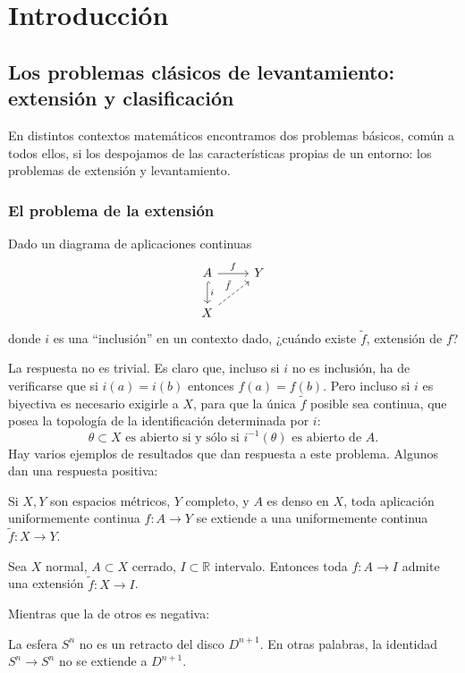 \chapter{Introducción}\label{cap1}
\section{Los problemas clásicos de levantamiento: extensión y clasificación}\label{sec:levext}
En distintos contextos matemáticos encontramos dos problemas básicos, común a todos ellos, si los despojamos de las características propias de un entorno: los problemas de extensión y levantamiento. \par

\subsection*{El problema de la extensión}\label{c1:ext}
Dado un diagrama de aplicaciones continuas 
$$
\begin{tikzcd}
	A \rar{f} \dar[hook]{i} & Y \\
	X \urar[dashed]{\tilde{f}}	&
\end{tikzcd} 
$$
donde $i$ es una ``inclusión'' en un contexto dado, ¿cuándo existe $\tilde{f}$, extensión de $f$? \par

La respuesta no es trivial. Es claro que, incluso si $i$ no es inclusión, ha de verificarse que si $i(a)= i(b)$ entonces $f(a) = f(b)$. Pero incluso si $i$ es biyectiva es necesario exigirle a $X$, para que la única $\tilde{f}$ posible sea continua, que posea la topología de la identificación determinada por $i$: 
$$
\theta \subset X \text{ es abierto si y sólo si } i^{-1} (\theta) \text{ es abierto de } A. 
$$
\newpage
Hay varios ejemplos de resultados que dan respuesta a este problema. Algunos dan una respuesta positiva:
\begin{teor} 
Si $X,Y$ son espacios métricos, $Y$ completo, y $A$ es denso en $X$, toda aplicación uniformemente continua $f:A\longrightarrow Y $ se extiende a una uniformemente continua $\tilde{f} : X \rightarrow Y$.
\end{teor} 

\begin{teor}
Sea $X$ normal, $A \subset X$ cerrado, $I \subset \mathbb{R}$ intervalo. Entonces toda $f : A \rightarrow I $  admite una extensión $\tilde{f} : X \rightarrow I$.
\end{teor}
\hypertarget{c1t:retractoh}{Mientras que la de otros es negativa:}
\begin{teor} \label{c1t:retracto}
La esfera $S^{n}$ no es un retracto del disco $D^{n+1}$. En otras palabras, la identidad $S^{n} \rightarrow S^{n}$ no se extiende a $D^{n+1}$.
\end{teor}

